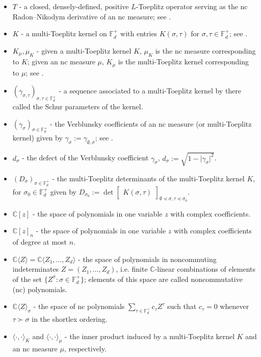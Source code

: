 \documentclass[11pt,reqno]{amsart}
\def\g{\gamma}
\def\s{\sigma}
\def\t{\tau}
\def\CC{\mathbb{C}}
\def\FF{\mathbb{F}}
\theoremstyle{definition}
\numberwithin{equation}{section}
\begin{document}
\begin{itemize}
    \item \(T\) - a closed, densely-defined, positive \(L\)-Toeplitz operator serving as the nc Radon--Nikodym derivative of an nc measure; see .
    \item \(K\) - a multi-Toeplitz kernel on \(\FF_d^+\) with entries \(K(\s,\t)\) for \(\s,\t \in \FF_d^+\); see .
    \item \(K_\mu, \mu_K\) - given a multi-Toeplitz kernel \(K\), \(\mu_K\) is the nc measure corresponding to \(K\); given an nc measure \(\mu\), \(K_\mu\) is the multi-Toeplitz kernel corresponding to \(\mu\); see .
    \item \((\g_{\s,\t})_{\s,\t \in \FF_d^+}\) - a sequence associated to a multi-Toeplitz kernel by \cite{CJ02b} there called the Schur parameters of the kernel.
    \item \((\g_{\s})_{\s \in \FF_d^+}\) - the Verblunsky coefficients of an nc measure (or multi-Toeplitz kernel) given by \(\g_{\s} := \g_{\emptyset,\s}\); see .
    \item \(d_\s\) - the defect of the Verblunsky coefficient \(\g_\s\), \(d_\s := \sqrt{1 - \lvert \g_\s \rvert^2}\).
    \item \((D_\s)_{\s\in\FF_d^+}\) - the multi-Toeplitz determinants of the multi-Toeplitz kernel \(K\), for \(\s_0 \in \FF_d^+\) given by \(D_{\s_0} := \det \begin{bmatrix} K(\s, \t) \end{bmatrix}_{\emptyset \preceq \s,\t \preceq \s_0}\).
    \item \(\CC[z]\) - the space of polynomials in one variable \(z\) with complex coefficients.
    \item \(\CC[z]_n\) - the space of polynomials in one variable \(z\) with complex coefficients of degree at most \(n\).
    \item \(\CC\langle Z \rangle = \CC \langle Z_1, \ldots, Z_d \rangle\) - the space of polynomials in noncommuting indeterminates \(Z = (Z_1, \ldots, Z_d)\), i.e. finite \(\CC\)-linear combinations of elements of the set \(\{Z^{\s} : \s \in \FF_d^+\}\); elements of this space are called noncommutative (nc) polynomials.
    \item \(\CC\langle Z \rangle_\s\) - the space of nc polynomials \(\sum_{\t \in \FF_d^+} c_\t Z^{\t}\) such that \(c_\t = 0\) whenever \(\t \succ \s\) in the shortlex ordering.
    \item \(\langle \cdot, \cdot \rangle_K\) and \(\langle \cdot , \cdot \rangle_\mu\) - the inner product induced by a multi-Toeplitz kernel \(K\) and an nc measure \(\mu\), respectively.

\end{itemize}
\end{document}
